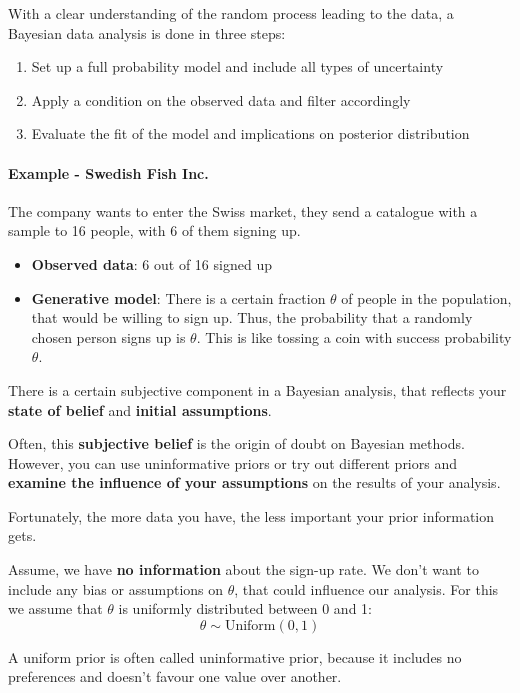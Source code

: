\documentclass[11pt]{article}
\begin{document}
With a clear understanding of the random process leading to the data, a Bayesian data analysis is done in three steps:
\begin{enumerate}
	\item Set up a full probability model and include all types of uncertainty
	\item Apply a condition on the observed data and filter accordingly
	\item Evaluate the fit of the model and implications on posterior distribution
\end{enumerate}

\paragraph{Example - Swedish Fish Inc.} The company wants to enter the Swiss market, they send a catalogue with a sample to 16 people, with 6 of them signing up. 
\begin{itemize}
	\item \textbf{Observed data}: 6 out of 16 signed up
	\item \textbf{Generative model}: There is a certain fraction $\theta$ of people in the population, that would be willing to sign up. Thus, the probability that a randomly chosen person signs up is $\theta$. This is like tossing a coin with success probability $\theta$.
\end{itemize}

There is a certain subjective component in a Bayesian analysis, that reflects your \textbf{state of belief} and \textbf{initial assumptions}.

Often, this \textbf{subjective belief} is the origin of doubt on Bayesian methods. However, you can use uninformative priors or try out different priors and \textbf{examine the influence of your assumptions} on the results of your analysis.

Fortunately, the more data you have, the less important your prior information gets.

Assume, we have \textbf{no information} about the sign-up rate. We don’t want to include any bias or assumptions on $\theta$, that could influence our analysis. For this we assume that $\theta$ is uniformly distributed between 0 and 1:
\begin{equation*}
	\theta\sim\text{Uniform}(0,1)
\end{equation*}

A uniform prior is often called uninformative prior, because it includes no preferences and doesn't favour one value over another.
\end{document}

